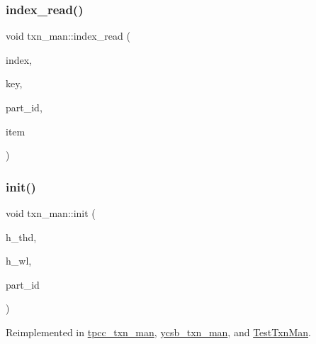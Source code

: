 \mbox{\label{classtxn__man_a20dbd5004ecb977f109e54fd0f60950f}} 
\subsubsection{\texorpdfstring{index\+\_\+read()}{index\_read()}\hspace{0.1cm}{\footnotesize\ttfamily [2/2]}}
{\footnotesize\ttfamily void txn\+\_\+man\+::index\+\_\+read (\begin{DoxyParamCaption}\item[{\hyperlink{classIndex}{Index} $\ast$}]{index,  }\item[{\hyperlink{global_8h_a29a17e29c9200c833b70a4ef8c89813e}{idx\+\_\+key\+\_\+t}}]{key,  }\item[{int}]{part\+\_\+id,  }\item[{\hyperlink{classitemid__t}{itemid\+\_\+t} $\ast$$\ast$}]{item }\end{DoxyParamCaption})}

\mbox{\label{classtxn__man_a778925bb3edd6a54a27161f67792edec}} 
\subsubsection{\texorpdfstring{init()}{init()}}
{\footnotesize\ttfamily void txn\+\_\+man\+::init (\begin{DoxyParamCaption}\item[{\hyperlink{classthread__t}{thread\+\_\+t} $\ast$}]{h\+\_\+thd,  }\item[{\hyperlink{classworkload}{workload} $\ast$}]{h\+\_\+wl,  }\item[{uint64\+\_\+t}]{part\+\_\+id }\end{DoxyParamCaption})\hspace{0.3cm}{\ttfamily [virtual]}}



Reimplemented in \hyperlink{classtpcc__txn__man_aa2a56c4cb192d138852488745ee09fd7}{tpcc\+\_\+txn\+\_\+man}, \hyperlink{classycsb__txn__man_a6708b67fbc560af1634f6d48cfa66b4f}{ycsb\+\_\+txn\+\_\+man}, and \hyperlink{classTestTxnMan_a55bd3947973927a82e87f249813fd4a0}{Test\+Txn\+Man}.

\mbox{\label{classtxn__man_a4097c7d52e098381113281b88b7c2533}} 
